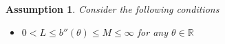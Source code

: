 \documentclass[11pt]{article}
\theoremstyle{plain}
\newtheorem{ass}{Assumption}
\theoremstyle{definition}
\begin{document}
\begin{ass}
Consider the following conditions
\begin{itemize}
\item $0<L\leq b''(\theta) \leq M\leq \infty$ for any $\theta \in \mathbb{R}$
\end{itemize}
\end{ass}
\end{document}
